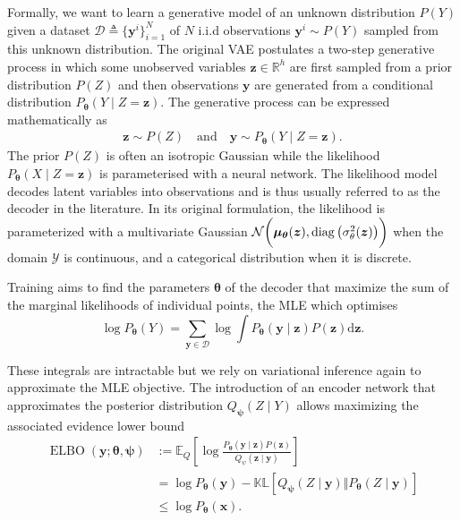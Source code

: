 Formally, we want to learn a generative model of an unknown distribution $P(Y)$ given a dataset $\mathcal{D} \triangleq \{\mathbf{y}^i\}^N_{i=1}$ of $N$ i.i.d observations $\mathbf{y}^i \sim P(Y)$ sampled from this unknown distribution.
The original VAE postulates a two-step generative process in which some unobserved variables $\mathbf{z} \in \mathbb{R}^h$ are first sampled from a prior distribution $P(Z)$ and then observations $\mathbf{y}$ are generated from a conditional distribution $P_{\mathbf{\theta}}(Y\mid Z=\mathbf{z})$. The generative process can be expressed mathematically as
\begin{align}
     \mathbf{z} \sim P(Z) \quad \text{and} \quad \mathbf{y} \sim P_{\mathbf{\theta}}(Y\mid Z=\mathbf{z}).
\end{align}
The prior $P(Z)$ is often an isotropic Gaussian while the likelihood $P_{\mathbf{\theta}}(X\mid Z=\mathbf{z})$ is parameterised with a neural network. The likelihood model decodes latent variables into observations and is thus usually referred to as the decoder in the literature. In its original formulation, the likelihood is parameterized with a multivariate Gaussian $\mathcal{N}\bigg(\mathbf{\mu_\theta}(\mathbf{z}), \diag\big(\sigma_\theta^2(\mathbf{z})\big)\bigg)$ when the domain $\mathcal{Y}$ is continuous, and a categorical distribution when it is discrete.

Training aims to find the parameters $\mathbf{\theta}$ of the decoder that maximize the sum of the marginal likelihoods of individual points, the MLE which optimises $$\log P_{\mathbf{\theta}}(Y)= \sum_{\mathbf{y}\in \mathcal{D}}\log \int P_{\mathbf{\theta}}(\mathbf{y}\mid \mathbf{z}) P(\mathbf{z}) \text{d}\mathbf{z}.$$

These integrals are intractable but we rely on variational inference again to approximate the MLE objective. The introduction of an encoder network that approximates the posterior distribution $Q_{\bm \psi}(Z\mid Y)$ allows maximizing the associated evidence lower bound
\begin{align}
    \operatorname{ELBO}(\bm{y}; \mathbf{\theta}, \mathbf{\psi})&:=\mathbb{E}_Q\left[\log \frac{P_{\mathbf{\theta}} (\mathbf{y}\mid \mathbf{z}) P(\mathbf{z})}{Q_\psi(\mathbf{z}\mid \mathbf{y})} \right]\label{eq:ELBO_VAE}\\
    &=\log P_{\mathbf{\theta}}(\mathbf{y}) - \mathbb{KL}\left[Q_{\bm \psi}(Z\mid \mathbf{y})\Vert P_{\mathbf{\theta}} (Z\mid \mathbf{y})\right]\\
    &\leq \log P_{\mathbf{\theta}}(\mathbf{x}).
\end{align}

